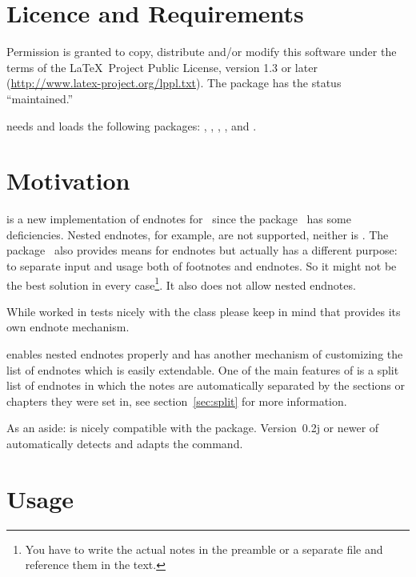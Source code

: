 \documentclass[toc=bib,toc=index]{cnpkgdoc}
\begin{document}
\section{Licence and Requirements}
Permission is granted to copy, distribute and/or modify this software under the
terms of the \LaTeX\ Project Public License, version 1.3 or later
(\url{http://www.latex-project.org/lppl.txt}). The package has the status
``maintained.''

\enotez needs and loads the following packages: , ,
, ,  and .

\section{Motivation}
\enotez is a new implementation of endnotes for \LaTeXe\ since the 
package~\cite{endnotes} has some deficiencies. Nested endnotes, for example, are
not supported, neither is . The  package~\cite{sepfootnotes}
also provides means for endnotes but actually has a different purpose: to
separate input and usage both of footnotes and endnotes. So it might not be the
best solution in every case\footnote{You have to write the actual notes in the
preamble or a separate file and reference them in the text.}. It also does not
allow nested endnotes.

While \enotez worked in tests nicely with the  class please keep
in mind that  provides its own endnote mechanism.

\enotez enables nested endnotes properly and has another mechanism of customizing
the list of endnotes which is easily extendable. One of the main features  of
\enotez is a split list of endnotes in which the notes are automatically
separated by the sections or chapters they were set in, see section~\ref{sec:split}
for more information.

As an aside: \enotez is nicely compatible with the  package.
Version~0.2j or newer of  automatically detects \enotez and adapts
the  command.

\section{Usage}
\end{document}
